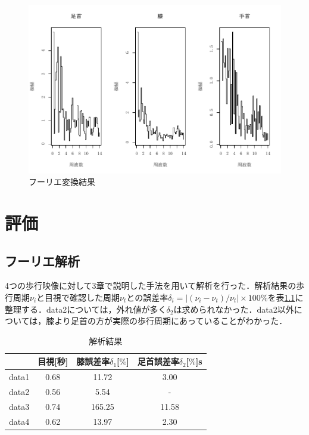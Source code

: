 \documentclass[a4j,10.5pt]{jreport}
\begin{document}
\begin{figure}
    \centering
    \includegraphics{figs/frequency.pdf}
    \caption{フーリエ変換結果}
    \label{fig:frequency}
\end{figure}

\chapter{評価}

\section{フーリエ解析}
4つの歩行映像に対して3章で説明した手法を用いて解析を行った．解析結果の歩行周期$\nu_i$と目視で確認した周期$\nu_t$との誤差率$\delta_i =|(\nu_i-\nu_t)/\nu_t|\times100\%$を表\ref{tab:結果}に整理する．data2については，外れ値が多く$\delta_2$は求められなかった．data2以外については，膝より足首の方が実際の歩行周期にあっていることがわかった．
\begin{table}[H]
\caption{解析結果} \label{tab:結果}
\vspace{5mm}
  \centering
  \begin{tabular}{c||ccc}
    \hline
            & 目視[秒] & 膝誤差率$\delta_1$[$\%$]& 足首誤差率$\delta_2$[$\%$]s\\ \hline
data1 & 0.68  & 11.72 & 3.00 \\ \hline
data2 & 0.56  & 5.54 & - \\ \hline
data3 & 0.74 & 165.25 & 11.58 \\ \hline
data4 & 0.62 & 13.97 & 2.30 \\ \hline
  \end{tabular}

\end{table}
\end{document}

